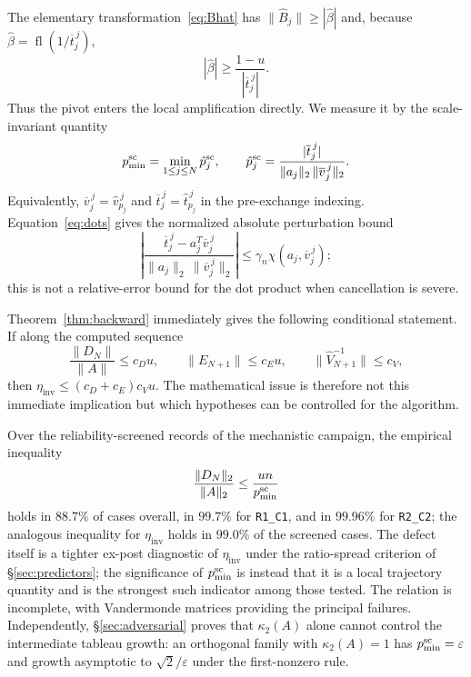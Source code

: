 \documentclass[review,onefignum,onetabnum]{siamart251216}
\newcommand{\fl}{\operatorname{fl}}
\begin{document}
The elementary transformation~\eqref{eq:Bhat} has
$\|\widehat B_j\|\ge|\hat\beta|$ and, because
$\hat\beta=\fl(1/\overline t_j^{\,j})$,
%
\[
|\hat\beta|\ge\frac{1-u}{|\overline t_j^{\,j}|}.
\]
%
Thus the pivot enters the local amplification directly. We measure it by the scale-invariant
quantity
%
\begin{equation}\label{eq:pmin}
p^{\rm sc}_{\min}=\min_{1\le j\le N}\hat p_j^{\rm sc},
\qquad
\hat p_j^{\rm sc}
=
\frac{|\overline t_j^{\,j}|}
     {\|a_j\|_2\,\|\overline v_j^{\,j}\|_2}.
\end{equation}
%
Equivalently, $\overline v_j^{\,j}=\widehat v_{p_j}^{\,j}$ and
$\overline t_j^{\,j}=\hat t_{p_j}^{\,j}$ in the pre-exchange indexing. Equation~\eqref{eq:dots}
gives the normalized absolute perturbation bound
%
\[
\left|
\frac{\overline t_j^{\,j}-a_j^T\overline v_j^{\,j}}
     {\|a_j\|_2\,\|\overline v_j^{\,j}\|_2}
\right|
\le\gamma_n\chi(a_j,\overline v_j^{\,j});
\]
%
this is not a relative-error bound for the dot product when cancellation is severe.

Theorem~\ref{thm:backward} immediately gives the following conditional statement. If along the
computed sequence
%
\begin{equation}\label{eq:hypotheses}
\frac{\|D_N\|}{\|A\|}\le c_Du,
\qquad
\|E_{N+1}\|\le c_Eu,
\qquad
\|\widehat V_{N+1}^{-1}\|\le c_V,
\end{equation}
%
then
$\eta_{\mathrm{inv}}\le(c_D+c_E)c_Vu$. The mathematical issue is therefore not this immediate
implication but which hypotheses can be controlled for the algorithm.

\begin{observation}\label{obs:pivot}
Over the reliability-screened records of the mechanistic campaign, the empirical inequality
%
\begin{equation}\label{eq:defect-pivot}
\frac{\|D_N\|_2}{\|A\|_2}
\le
\frac{un}{p^{\rm sc}_{\min}}
\end{equation}
%
holds in $88.7\%$ of cases overall, in $99.7\%$ for \texttt{R1\_C1}, and in $99.96\%$ for
\texttt{R2\_C2}; the analogous inequality for $\eta_{\mathrm{inv}}$ holds in $99.0\%$ of the
screened cases. The defect itself is a tighter ex-post diagnostic of $\eta_{\mathrm{inv}}$ under
the ratio-spread criterion of \S\ref{sec:predictors}; the significance of
$p^{\rm sc}_{\min}$ is instead that it is a local trajectory quantity and is the strongest such
indicator among those tested. The relation is incomplete, with Vandermonde matrices providing the
principal failures. Independently, \S\ref{sec:adversarial} proves that $\kappa_2(A)$ alone cannot
control the intermediate tableau growth: an orthogonal family with $\kappa_2(A)=1$ has
$p^{\rm sc}_{\min}=\varepsilon$ and growth asymptotic to $\sqrt2/\varepsilon$ under the
first-nonzero rule.
\end{observation}
\end{document}

